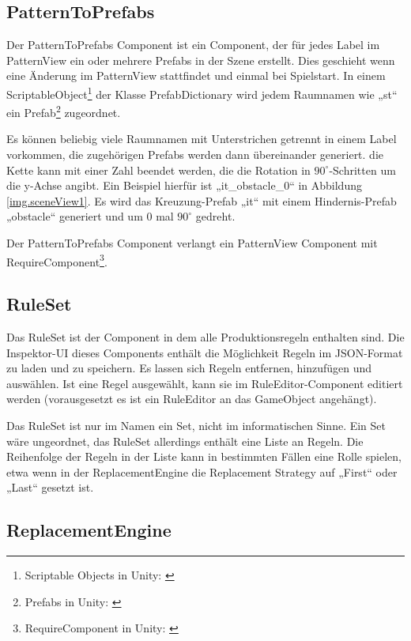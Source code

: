 \subsection{PatternToPrefabs}

Der PatternToPrefabs Component ist ein Component, der für jedes Label im PatternView ein oder mehrere Prefabs in der Szene erstellt. Dies geschieht wenn eine Änderung im PatternView stattfindet und einmal bei Spielstart. In einem ScriptableObject\footnote{Scriptable Objects in Unity: \cite[Seite: class-ScriptableObject]{unityManual}} der Klasse PrefabDictionary wird jedem Raumnamen wie „st“ ein Prefab\footnote{Prefabs in Unity: \cite[Seite: LearningtheInterface]{unityManual}} zugeordnet. 

Es können beliebig viele Raumnamen mit Unterstrichen getrennt in einem Label vorkommen, die zugehörigen Prefabs werden dann übereinander generiert. die Kette kann mit einer Zahl beendet werden, die die Rotation in $90^\circ$-Schritten um die y-Achse angibt. Ein Beispiel hierfür ist „it\_obstacle\_0“ in Abbildung \ref{img.sceneView1}. Es wird das Kreuzung-Prefab „it“ mit einem Hindernis-Prefab „obstacle“ generiert und um 0 mal $90^\circ$ gedreht.

Der PatternToPrefabs Component verlangt ein PatternView Component mit RequireComponent\footnote{RequireComponent in Unity: \cite[Seite: RequireComponent]{unitySciptingReference}}.

\subsection{RuleSet}

Das RuleSet ist der Component in dem alle Produktionsregeln enthalten sind. Die Inspektor-UI dieses Components enthält die Möglichkeit Regeln im JSON-Format zu laden und zu speichern. Es lassen sich Regeln entfernen, hinzufügen und auswählen. Ist eine Regel ausgewählt, kann sie im RuleEditor-Component editiert werden (vorausgesetzt es ist ein RuleEditor an das GameObject angehängt).

Das RuleSet ist nur im Namen ein Set, nicht im informatischen Sinne. Ein Set wäre ungeordnet, das RuleSet allerdings enthält eine Liste an Regeln. Die Reihenfolge der Regeln in der Liste kann in bestimmten Fällen eine Rolle spielen, etwa wenn in der ReplacementEngine die Replacement Strategy auf „First“ oder „Last“ gesetzt ist.

\subsection{ReplacementEngine}

